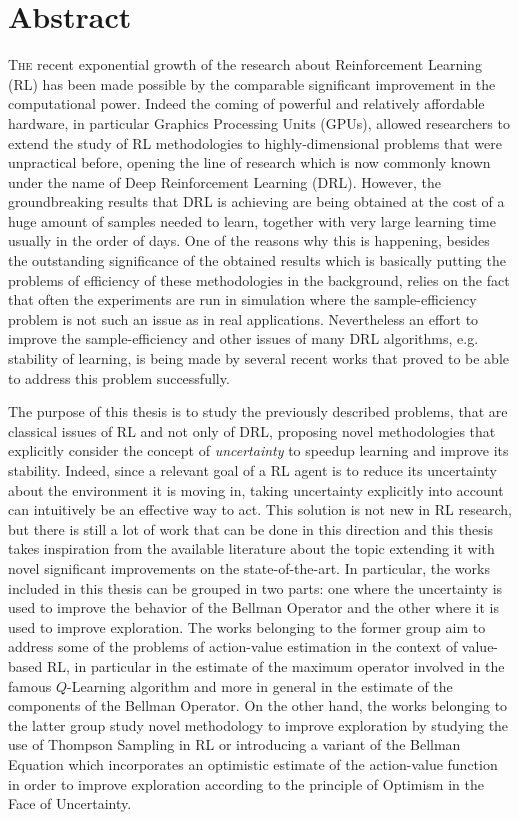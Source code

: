 \chapter*{Abstract}
\lettrine{T}{he} recent exponential growth of the research about Reinforcement Learning (RL) has been made possible by the comparable significant improvement in the computational power. Indeed the coming of powerful and relatively affordable hardware, in particular Graphics Processing Units (GPUs), allowed researchers to extend the study of RL methodologies to highly-dimensional problems that were unpractical before, opening the line of research which is now commonly known under the name of Deep Reinforcement Learning (DRL). However, the groundbreaking results that DRL is achieving are being obtained at the cost of a huge amount of samples needed to learn, together with very large learning time usually in the order of days. One of the reasons why this is happening, besides the outstanding significance of the obtained results which is basically putting the problems of efficiency of these methodologies in the background, relies on the fact that often the experiments are run in simulation where the sample-efficiency problem is not such an issue as in real applications. Nevertheless an effort to improve the sample-efficiency and other issues of many DRL algorithms, e.g. stability of learning, is being made by several recent works that proved to be able to address this problem successfully.

The purpose of this thesis is to study the previously described problems, that are classical issues of RL and not only of DRL, proposing novel methodologies that explicitly consider the concept of \textit{uncertainty} to speedup learning and improve its stability. Indeed, since a relevant goal of a RL agent is to reduce its uncertainty about the environment it is moving in, taking uncertainty explicitly into account can intuitively be an effective way to act. This solution is not new in RL research, but there is still a lot of work that can be done in this direction and this thesis takes inspiration from the available literature about the topic extending it with novel significant improvements on the state-of-the-art. In particular, the works included in this thesis can be grouped in two parts: one where the uncertainty is used to improve the behavior of the Bellman Operator and the other where it is used to improve exploration. The works belonging to the former group aim to address some of the problems of action-value estimation in the context of value-based RL, in particular in the estimate of the maximum operator involved in the famous $Q$-Learning algorithm and more in general in the estimate of the components of the Bellman Operator. On the other hand, the works belonging to the latter group study novel methodology to improve exploration by studying the use of Thompson Sampling in RL or introducing a variant of the Bellman Equation which incorporates an optimistic estimate of the action-value function in order to improve exploration according to the principle of Optimism in the Face of Uncertainty.

